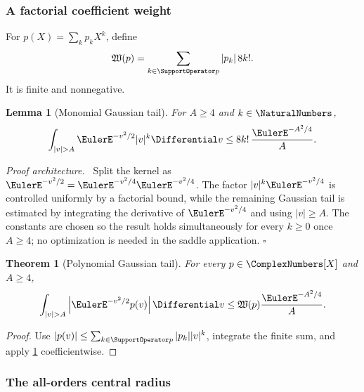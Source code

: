 \documentclass[11pt,oneside]{article}
\newtheorem{theorem}{Theorem}[section]
\newtheorem{lemma}[lemma]{Lemma}
\theoremstyle{definition}
\theoremstyle{remark}
\newenvironment{proofidea}{\par\smallskip\noindent\textit{Proof architecture.}\ }{\hfill$\square$\par\smallskip}
\begin{document}
\subsubsection{A factorial coefficient weight}

For $p(X)=\sum_kp_kX^k$, define
\begin{equation}
 \mathfrak W(p)=\sum_{k\in\SupportOperator p}|p_k|\,8k!.
 \label{integration:eq:gaussian-tail-weight}
\end{equation}
It is finite and nonnegative.

\begin{lemma}[Monomial Gaussian tail]
\label{integration:lem:monomial-gaussian-tail}
For $A\ge4$ and $k\in\NaturalNumbers$,
\begin{equation}
 \int_{|v|>A}\EulerE^{-v^2/2}|v|^k\Differential v
 \le 8k!\,\frac{\EulerE^{-A^2/4}}{A}.
 \label{integration:eq:monomial-gaussian-tail}
\end{equation}
\end{lemma}

\begin{proofidea}
Split the kernel as
$\EulerE^{-v^2/2}=\EulerE^{-v^2/4}\EulerE^{-v^2/4}$.  The factor
$|v|^k\EulerE^{-v^2/4}$ is controlled uniformly by a factorial bound, while the remaining
Gaussian tail is estimated by integrating the derivative of $\EulerE^{-v^2/4}$ and using
$|v|\ge A$.  The constants are chosen so the result holds simultaneously for every
$k\ge0$ once $A\ge4$; no optimization is needed in the saddle application.
\end{proofidea}

\begin{theorem}[Polynomial Gaussian tail]
\label{integration:thm:polynomial-gaussian-tail}
For every $p\in\ComplexNumbers[X]$ and $A\ge4$,
\begin{equation}
 \int_{|v|>A}\left|\EulerE^{-v^2/2}p(v)\right|\Differential v
 \le \mathfrak W(p)\frac{\EulerE^{-A^2/4}}{A}.
 \label{integration:eq:polynomial-gaussian-tail}
\end{equation}
\end{theorem}

\begin{proof}
Use
$|p(v)|\le\sum_{k\in\SupportOperator p}|p_k||v|^k$, integrate the finite sum, and apply
\cref{integration:lem:monomial-gaussian-tail} coefficientwise.
\end{proof}

\subsubsection{The all-orders central radius}
\end{document}
